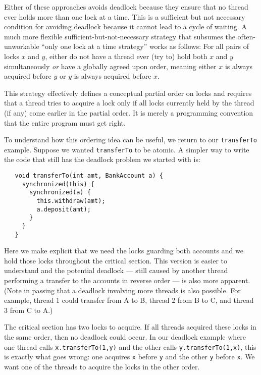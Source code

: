 \documentclass[10pt]{article}
\begin{document}
Either of these approaches avoids deadlock because they ensure that no
thread ever holds more than one lock at a time.  This is a sufficient
but not necessary condition for avoiding deadlock because it cannot
lead to a cycle of waiting.  A much more flexible
sufficient-but-not-necessary strategy that subsumes the
often-unworkable ``only one lock at a time strategy'' works as
follows: For all pairs of locks $x$ and $y$, either do not have a
thread ever (try to) hold both $x$ and $y$ simultaneously \emph{or}
have a globally agreed upon order, meaning either $x$ is always
acquired before $y$ or $y$ is always acquired before $x$.

This strategy effectively defines a conceptual partial order on locks
and requires that a thread tries to acquire a lock only if all locks
currently held by the thread (if any) come earlier in the partial
order.  It is merely a programming convention that the entire program
must get right.

To understand how this ordering idea can be useful, we return to our
{\tt transferTo} example.  Suppose we wanted {\tt transferTo} to be
atomic.  A simpler way to write the code that still has the deadlock
problem we started with is:
\begin{verbatim}
   void transferTo(int amt, BankAccount a) {
     synchronized(this) {
       synchronized(a) {
         this.withdraw(amt);
         a.deposit(amt);
       }
     }
   }
\end{verbatim}
Here we make explicit that we need the locks guarding both accounts
and we hold those locks throughout the critical section.  This version
is easier to understand and the potential deadlock --- still caused by
another thread performing a transfer to the accounts in reverse order
--- is also more apparent.  (Note in passing that a deadlock involving
more threads is also possible.  For example, thread 1 could transfer
from A to B, thread 2 from B to C, and thread 3 from C to A.)

The critical section has two locks to acquire.  If all threads
acquired these locks in the same order, then no deadlock could occur.  In
our deadlock example where one thread calls {\tt x.transferTo(1,y)}
and the other calls {\tt y.transferTo(1,x)}, this is exactly what goes
wrong: one acquires {\tt x} before {\tt y} and the other {\tt y}
before {\tt x}.  We want one of the threads to acquire the locks in
the other order.
\end{document}
